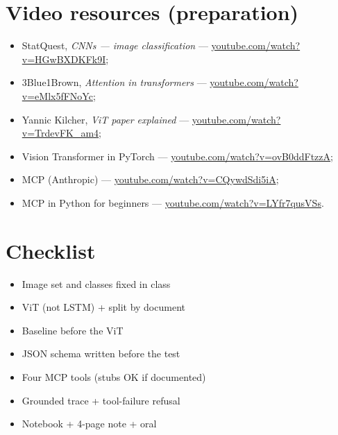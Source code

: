 \documentclass[11pt,a4paper]{article}
\begin{document}
\section{Video resources (preparation)}

\begin{itemize}
  \item StatQuest, \emph{CNNs --- image classification} ---
        \href{https://www.youtube.com/watch?v=HGwBXDKFk9I}{youtube.com/watch?v=HGwBXDKFk9I};
  \item 3Blue1Brown, \emph{Attention in transformers} ---
        \href{https://www.youtube.com/watch?v=eMlx5fFNoYc}{youtube.com/watch?v=eMlx5fFNoYc};
  \item Yannic Kilcher, \emph{ViT paper explained} ---
        \href{https://www.youtube.com/watch?v=TrdevFK_am4}{youtube.com/watch?v=TrdevFK\_am4};
  \item Vision Transformer in PyTorch ---
        \href{https://www.youtube.com/watch?v=ovB0ddFtzzA}{youtube.com/watch?v=ovB0ddFtzzA};
  \item MCP (Anthropic) ---
        \href{https://www.youtube.com/watch?v=CQywdSdi5iA}{youtube.com/watch?v=CQywdSdi5iA};
  \item MCP in Python for beginners ---
        \href{https://www.youtube.com/watch?v=LYfr7qusVSs}{youtube.com/watch?v=LYfr7qusVSs}.
\end{itemize}

\section{Checklist}

\begin{itemize}
  \item[$\square$] Image set and classes fixed in class
  \item[$\square$] ViT (not LSTM) + split by document
  \item[$\square$] Baseline before the ViT
  \item[$\square$] JSON schema written before the test
  \item[$\square$] Four MCP tools (stubs OK if documented)
  \item[$\square$] Grounded trace + tool-failure refusal
  \item[$\square$] Notebook + 4-page note + oral
\end{itemize}
\end{document}
